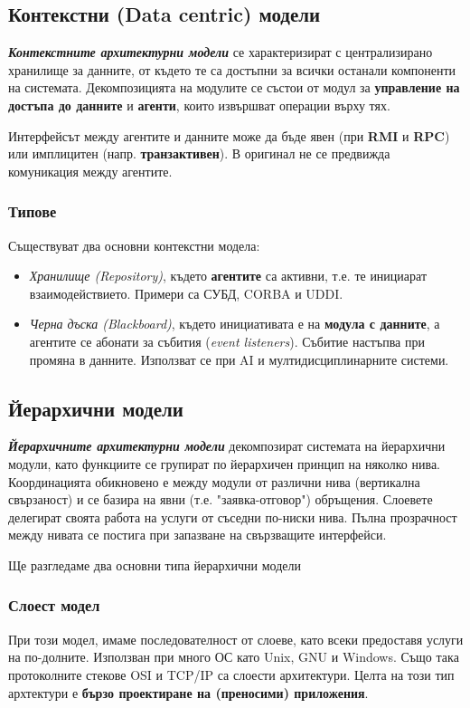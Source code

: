 \documentclass[fleqn,12pt]{article}
\begin{document}
\subsection{Контекстни (Data centric) модели}

\textbf{\textit{Контекстните архитектурни модели}} се характеризират с централизирано хранилище за данните, от където те са достъпни за всички останали компоненти на системата.
Декомпозицията на модулите се състои от модул за \textbf{управление на достъпа до данните} и \textbf{агенти}, които извършват операции върху тях.

Интерфейсът между агентите и данните може да бъде явен (при \textbf{RMI} и \textbf{RPC}) или имплицитен (напр. \textbf{транзактивен}).
В оригинал не се предвижда комуникация между агентите.

\subsubsection{Типове}
Съществуват два основни контекстни модела:
\begin{itemize}
    \item \textit{Хранилище (Repository)}, където \textbf{агентите} са активни, т.е. те инициарат взаимодействието. Примери са СУБД, CORBA и UDDI.
    \item \textit{Черна дъска (Blackboard)}, където инициативата е на \textbf{модула с данните}, а агентите се абонати за събития (\textit{event listeners}).
    Събитие настъпва при промяна в данните.
    Използват се при AI и мултидисциплинарните системи.
\end{itemize}

\subsection{Йерархични модели}

\textbf{\textit{Йерархичните архитектурни модели}} декомпозират системата на йерархични модули, като функциите се групират по йерархичен принцип на няколко нива.
Координацията обикновено е между модули от различни нива (вертикална свързаност) и се базира на явни (т.е. "заявка-отговор") обръщения.
Слоевете делегират своята работа на услуги от съседни по-ниски нива.
Пълна прозрачност между нивата се постига при запазване на свързващите интерфейси.

Ще разгледаме два основни типа йерархични модели
\subsubsection{Слоест модел}
При този модел, имаме последователност от слоеве, като всеки предоставя услуги на по-долните.
Използван при много ОС като Unix, GNU и Windows. Също така протоколните стекове OSI и TCP/IP са слоести архитектури.
Целта на този тип архтектури е \textbf{бързо проектиране на (преносими) приложения}.
\end{document}
